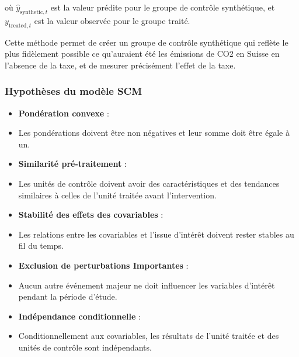 où $\hat{y}_{\text{synthetic}, t}$ est la valeur prédite pour le groupe de contrôle synthétique, et $y_{\text{treated}, t}$ est la valeur observée pour le groupe traité.

Cette méthode permet de créer un groupe de contrôle synthétique qui reflète le plus fidèlement possible ce qu'auraient été les émissions de CO2 en Suisse en l'absence de la taxe, et de mesurer précisément l'effet de la taxe.

\subsubsection{Hypothèses du modèle SCM}
\label{subsec:strategie_scm_hypothesis}

\begin{itemize}
    \item[] \textbf{Pondération convexe} : 
    \item[] Les pondérations doivent être non négatives et leur somme doit être égale à un.
    \item[] \textbf{Similarité pré-traitement} : 
    \item[] Les unités de contrôle doivent avoir des caractéristiques et des tendances similaires à celles de l'unité traitée avant l'intervention.
    \item[] \textbf{Stabilité des effets des covariables} : 
    \item[] Les relations entre les covariables et l'issue d'intérêt doivent rester stables au fil du temps.
    \item[] \textbf{Exclusion de perturbations Importantes} : 
    \item[] Aucun autre événement majeur ne doit influencer les variables d'intérêt pendant la période d'étude.
    \item[] \textbf{Indépendance conditionnelle} :
    \item[] Conditionnellement aux covariables, les résultats de l'unité traitée et des unités de contrôle sont indépendants.
\end{itemize}

